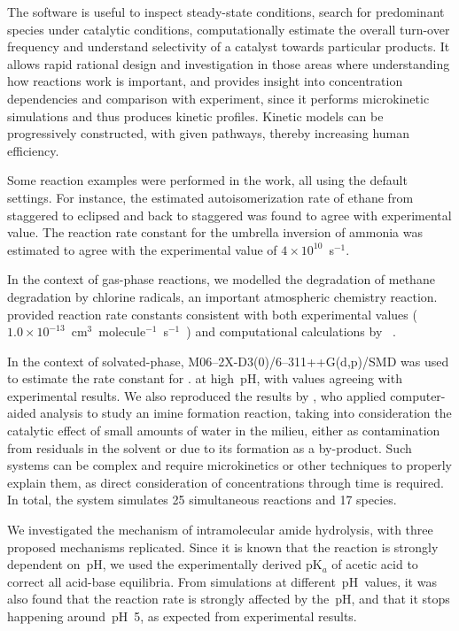 The software is useful to inspect steady-state conditions,
search for predominant species under catalytic conditions,
computationally estimate the overall turn-over frequency and understand selectivity of a catalyst towards particular products.
It allows rapid rational design and investigation in those areas where understanding how reactions work is important,
and provides insight into concentration dependencies and comparison with experiment,
since it performs microkinetic simulations
and thus produces kinetic profiles.
Kinetic models can be progressively constructed,
with given pathways,
thereby increasing human efficiency.

Some reaction examples were performed in the work,
all using the default settings.
For instance,
the estimated autoisomerization rate of ethane from staggered to eclipsed
and back to staggered was found to agree with experimental value.
The reaction rate constant for the umbrella inversion of ammonia was estimated to agree
with the experimental value of $4 \times 10^{10}$~s$^{-1}$.

In the context of gas-phase reactions,
we modelled the degradation of methane degradation by chlorine radicals,
an important atmospheric chemistry reaction.
\overreact provided reaction rate constants consistent with both experimental values
($1.0 \times 10^{-13}$~cm$^3$~molecule$^{-1}$~s$^{-1}$~\cite{Burkholder_2020})
and computational calculations
by \citeauthor{Tanaka_1996}~\cite{Tanaka_1996}.

In the context of solvated-phase,
M06--2X-D3(0)/6--311++G(d,p)/SMD was used to estimate the rate constant for .
at high~pH,
with values agreeing with experimental results.
We also reproduced the results by \citeauthor{P_rez_Soto_2020},
who applied computer-aided analysis
to study an imine formation reaction,
taking into consideration the catalytic effect of small amounts of water in the milieu,
either as contamination from residuals in the solvent
or due to its formation as a by-product.
Such systems can be complex and require microkinetics or other techniques to properly explain them,
as direct consideration of concentrations through time is required.
In total,
the system simulates 25 simultaneous reactions and 17 species.

We investigated the mechanism of intramolecular amide hydrolysis,
with three proposed mechanisms replicated.
Since it is known that the reaction is strongly dependent on~pH,
we used the experimentally derived pK$_a$ of acetic acid to correct all acid-base equilibria.
From simulations at different~pH~values,
it was also found that the reaction rate is strongly affected by the~pH,
and that it stops happening around~pH~5,
as expected from experimental results.

